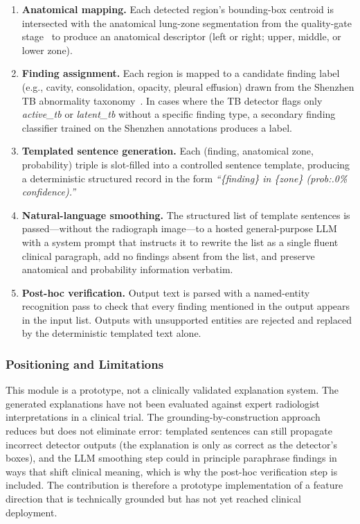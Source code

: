 \documentclass[conference, letterpaper]{IEEEtran}
\begin{document}
\begin{enumerate}
    \item \textbf{Anatomical mapping.} Each detected region's bounding-box centroid is intersected with the anatomical lung-zone segmentation from the quality-gate stage~\cite{cohen2022torchxrayvision} to produce an anatomical descriptor (left or right; upper, middle, or lower zone).
    \item \textbf{Finding assignment.} Each region is mapped to a candidate finding label (e.g., cavity, consolidation, opacity, pleural effusion) drawn from the Shenzhen TB abnormality taxonomy~\cite{yang2022shenzhen_annotations}. In cases where the TB detector flags only \textit{active\_tb} or \textit{latent\_tb} without a specific finding type, a secondary finding classifier trained on the Shenzhen annotations produces a label.
    \item \textbf{Templated sentence generation.} Each (finding, anatomical zone, probability) triple is slot-filled into a controlled sentence template, producing a deterministic structured record in the form \textit{``\{finding\} in \{zone\} ({prob:.0\%} confidence).''}
    \item \textbf{Natural-language smoothing.} The structured list of template sentences is passed---without the radiograph image---to a hosted general-purpose LLM with a system prompt that instructs it to rewrite the list as a single fluent clinical paragraph, add no findings absent from the list, and preserve anatomical and probability information verbatim.
    \item \textbf{Post-hoc verification.} Output text is parsed with a named-entity recognition pass to check that every finding mentioned in the output appears in the input list. Outputs with unsupported entities are rejected and replaced by the deterministic templated text alone.
\end{enumerate}

\subsubsection{Positioning and Limitations}

This module is a prototype, not a clinically validated explanation system. The generated explanations have not been evaluated against expert radiologist interpretations in a clinical trial. The grounding-by-construction approach reduces but does not eliminate error: templated sentences can still propagate incorrect detector outputs (the explanation is only as correct as the detector's boxes), and the LLM smoothing step could in principle paraphrase findings in ways that shift clinical meaning, which is why the post-hoc verification step is included. The contribution is therefore a prototype implementation of a feature direction that is technically grounded but has not yet reached clinical deployment.
\end{document}
